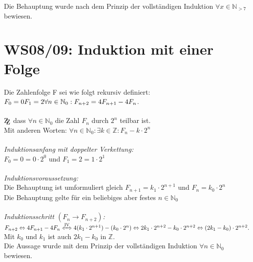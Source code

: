\documentclass[11pt]{article} %
\newcommand{\zz}{\mathrm{Z\kern-.3em\raise-0.5ex\hbox{Z}}} %
\begin{document}
Die Behauptung wurde nach dem Prinzip der vollständigen Induktion $\forall x \in \mathbb{N}_{>7}$ bewiesen.



\section{WS08/09: Induktion mit einer Folge}
Die Zahlenfolge F sei wie folgt rekursiv definiert:\\
$F_0 = 0\\
F_1 = 2\\
\forall n \in \mathbb{N}_0: F_{n+2} = 4F_{n+1} - 4F_{n}$.\\
\ \\
$\zz$ dass $\forall n \in \mathbb{N}_0$ die Zahl $F_n$ durch $2^n$ teilbar ist.\\
Mit anderen Worten: $\forall n \in \mathbb{N}_0: \exists k \in \mathbb{Z}: F_n - k \cdot 2^n$\\
\ \\
\emph{Induktionsanfang mit doppelter Verkettung:}\\
$F_0 = 0 = 0 \cdot 2^0$ und $F_1 = 2 = 1 \cdot 2^1$\\
\ \\
\emph{Induktionsvoraussetzung:}\\
Die Behauptung ist umformuliert gleich $F_{n+1} = k_1 \cdot 2^{n+1}$ und $F_n = k_0 \cdot 2^n$\\
Die Behauptung gelte für ein beliebiges aber festes $n \in \mathbb{N}_0$\\
\ \\
\emph{Induktionsschritt $(F_n \rightarrow F_{n+2})$:}\\
$F_{n+2} \Leftrightarrow  4 F_{n+1} - 4 F_n \xLeftrightarrow{\text{IV}} 4(k_1 \cdot 2^{n+1}) - (k_0 \cdot 2^n) \Leftrightarrow 2k_1 \cdot 2^{n+2} - k_0 \cdot 2^{n+2} \Leftrightarrow (2k_1 - k_0) \cdot 2^{n+2}.$\\
Mit $k_0$ und $k_1$ ist auch $2k_1 - k_0$ in $\mathbb{Z}$.\\


Die Aussage wurde mit dem Prinzip der vollständigen Induktion $\forall n \in \mathbb{N}_0$ bewiesen.
\end{document}
